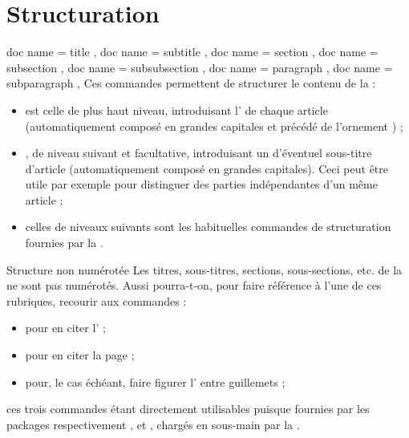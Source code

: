 \documentclass{letgut}
\begin{document}
\section{Structuration}
\label{sec:structuration}

\begin{docCommands}[
  doc parameter = \oarg{intitulé alternatif}\marg{intitulé}
  ]
  {
    { doc name = title },
    { doc name = subtitle },
    { doc name = section },
    { doc name = subsection },
    { doc name = subsubsection },
    { doc name = paragraph },
    { doc name = subparagraph },
  }
  Ces commandes permettent de structurer le contenu de la  :
  \begin{itemize}
  \item {} est celle de plus haut niveau, introduisant
    l' de chaque article (automatiquement composé en grandes
    capitales et précédé de l'ornement \aldineleft) ;
  \item {}, de niveau suivant et facultative, introduisant un
     d'éventuel sous-titre d'article (automatiquement composé en
    grandes capitales). Ceci peut être utile par exemple pour distinguer des
    parties indépendantes d'un même article ;
  \item celles de niveaux suivants sont les habituelles commandes de
    structuration fournies par la .
  \end{itemize}
\end{docCommands}

\begin{dbremark}{Structure non numérotée}{}
  Les titres, sous-titres, sections, sous-sections, etc. de la  ne sont
  pas numérotés. Aussi pourra-t-on, pour faire référence à l'une de ces
  rubriques, recourir aux commandes :
  \begin{itemize}
  \item {} pour en citer l' ;
  \item {} pour en citer la page ;
  \item {} pour, le cas échéant, faire figurer
    l' entre guillemets ;
  \end{itemize}
  ces trois commandes étant directement utilisables puisque fournies par les
  packages respectivement ,  et
  , chargés en sous-main par la .
\end{dbremark}
\end{document}

